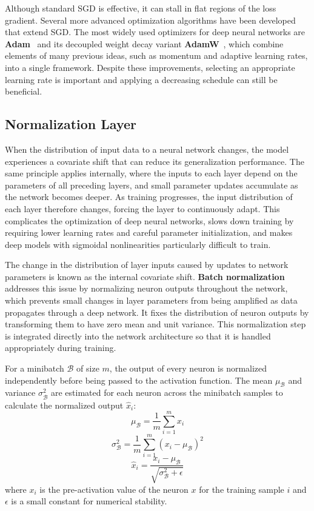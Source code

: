 Although standard SGD is effective, it can stall in flat regions of the loss gradient. Several more advanced optimization algorithms have been developed that extend SGD. The most widely used optimizers for deep neural networks are \textbf{Adam}~\cite{Kingma2014} and its decoupled weight decay variant \textbf{AdamW}~\cite{Loshchilov2019}, which combine elements of many previous ideas, such as momentum and adaptive learning rates, into a single framework. Despite these improvements, selecting an appropriate learning rate is important and applying a decreasing schedule can still be beneficial.~\cite{Szeliski2022, Lecun1998, Krichen2023}

\subsection{Normalization Layer}
When the distribution of input data to a neural network changes, the model experiences a covariate shift that can reduce its generalization performance. The same principle applies internally, where the inputs to each layer depend on the parameters of all preceding layers, and small parameter updates accumulate as the network becomes deeper. As training progresses, the input distribution of each layer therefore changes, forcing the layer to continuously adapt. This complicates the optimization of deep neural networks, slows down training by requiring lower learning rates and careful parameter initialization, and makes deep models with sigmoidal nonlinearities particularly difficult to train.

The change in the distribution of layer inputs caused by updates to network parameters is known as the internal covariate shift. \textbf{Batch normalization}~\cite{Ioffe2015} addresses this issue by normalizing neuron outputs throughout the network, which prevents small changes in layer parameters from being amplified as data propagates through a deep network. It fixes the distribution of neuron outputs by transforming them to have zero mean and unit variance. This normalization step is integrated directly into the network architecture so that it is handled appropriately during training.

For a minibatch $\mathcal{B}$ of size $m$, the output of every neuron is normalized independently before being passed to the activation function. The mean $\mu_\mathcal{B}$ and variance $\sigma_\mathcal{B}^2$ are estimated for each neuron across the minibatch samples to calculate the normalized output $\hat{x}_i$:
\begin{equation}
     \mu_\mathcal{B} = \frac{1}{m} \sum_{i = 1}^m x_i
\end{equation}
\begin{equation}
    \sigma_\mathcal{B}^2 = \frac{1}{m} \sum_{i = 1}^m (x_i - \mu_\mathcal{B})^2
\end{equation}
\begin{equation}
    \hat{x}_i = \frac{x_i - \mu_\mathcal{B}}{\sqrt{\sigma_\mathcal{B}^2 + \epsilon}}
\end{equation}
where $x_i$ is the pre-activation value of the neuron $x$ for the training sample $i$ and $\epsilon$ is a small constant for numerical stability.

